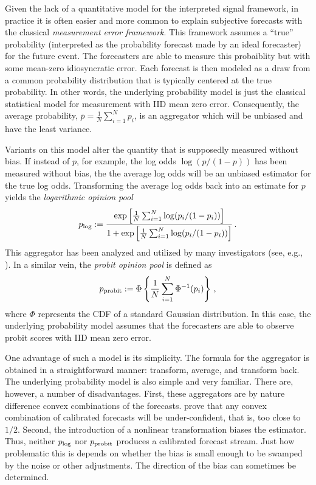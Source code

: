 \documentclass[11pt]{article}
\theoremstyle{definition}
\theoremstyle{definition}
\def\pb{\overline{p}}
\def\probit{p_{\rm probit}}
\def\plog{p_{\rm log}}
\begin{document}
Given the lack of a quantitative model for the interpreted signal framework, in practice it is often easier and more common to explain subjective
forecasts with the classical {\em measurement error framework}.  This framework assumes a ``true'' probability (interpreted
as the probability forecast made by an ideal forecaster) for the future 
event.  The forecasters are able to measure this probaiblity but with
some mean-zero idiosyncratic error.  Each forecast is then modeled
as a draw from a common probability distribution that is typically 
centered at the true probability.  
%
In other words, the underlying probability model is just the classical statistical
model for measurement with IID mean zero error.  Consequently, the average probability, $\pb = \frac{1}{N}\sum_{i=1}^N p_i$,
is an aggregator which will be unbiased and have the least variance.

Variants on this model alter the quantity that is supposedly 
measured without bias.  If instead of $p$, for example,
the log odds $\log (p/(1-p))$ has been measured without bias, 
the the average log odds will be an unbiased estimator for
the true log odds.  Transforming the average log odds back into
an estimate for $p$ yields the {\em logarithmic opinion pool}
$$\plog := \frac{\exp \left [ \frac{1}{N} \sum_{i=1}^N
   \log (p_i / (1-p_i)) \right ]}
{1 + \exp \left [ \frac{1}{N} \sum_{i=1}^N
   \log (p_i / (1-p_i)) \right ]} \, .$$
This aggregator has been analyzed and utilized by many investigators
(see, e.g., \citet{dawid1995coherent, Genest, bacharach1975group}).
In a similar vein, the {\em probit opinion pool} is defined as
$$\probit := \Phi \left \{ \frac{1}{N} \sum_{i=1}^N \Phi^{-1}
   (p_i) \right \} \, ,$$
 where $\Phi$ represents the CDF of a standard Gaussian distribution. In this case, the underlying probability model assumes that the forecasters are able
to observe probit scores with IID mean zero error.

One advantage of such a model is its simplicity.  The formula
for the aggregator is obtained in a straightforward manner: 
transform, average, and transform back.  The underlying probability
model is also simple and very familiar.  There are, however, a number
of disadvantages.  First, these aggregators are by nature difference convex combinations of the forecasts. \citet{Ranjan08} prove that any convex combination of calibrated forecasts will be under-confident, that is, too close to $1/2$. Second, the introduction of a nonlinear 
transformation biases the estimator.  Thus, neither $\plog$ 
nor $\probit$ produces a calibrated forecast stream.  Just how
problematic this is depends on whether the bias is small enough
to be swamped by the noise or other adjustments.  The direction of
the bias can sometimes be determined. 
\end{document}
